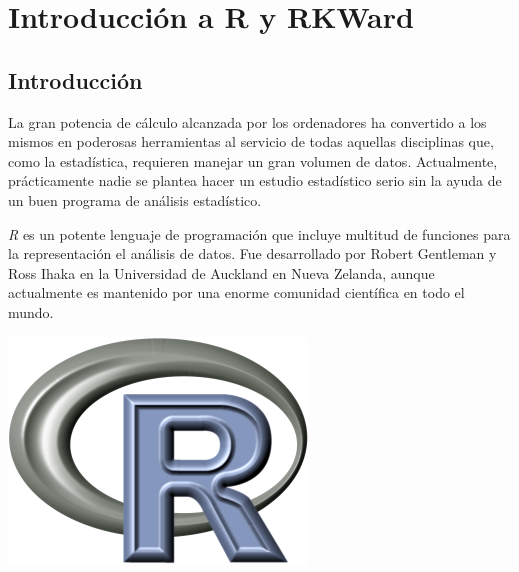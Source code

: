 \chapter{Introducción a R y RKWard}

\section{Introducción}
La gran potencia de cálculo alcanzada por los ordenadores ha convertido a los mismos en poderosas herramientas al
servicio de todas aquellas disciplinas que, como la estadística, requieren manejar un gran volumen de datos.
Actualmente, prácticamente nadie se plantea hacer un estudio estadístico serio sin la ayuda de un buen programa de
análisis estadístico.

\emph{R} es un potente lenguaje de programación que incluye multitud de funciones para la representación el análisis de
datos.
Fue desarrollado por Robert Gentleman y Ross Ihaka en la Universidad de Auckland en Nueva Zelanda, aunque actualmente es
mantenido por una enorme comunidad científica en todo el mundo.

\begin{center}
\includegraphics[scale=0.5]{introduccion_r/img/Rlogo}
\end{center} 

